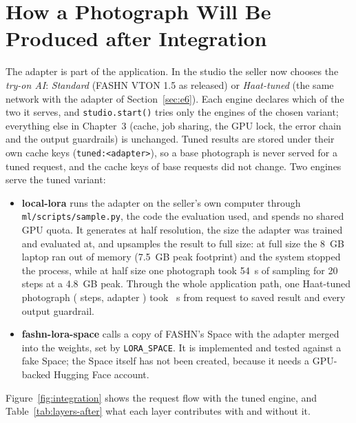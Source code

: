 \section{How a Photograph Will Be Produced after Integration}
\label{sec:integration}

The adapter is part of the application. In the studio the seller now chooses the \emph{try-on AI}: \emph{Standard} (FASHN VTON 1.5 as released) or \emph{Haat-tuned} (the same network with the adapter of Section~\ref{sec:e6}). Each engine declares which of the two it serves, and \texttt{studio.start()} tries only the engines of the chosen variant; everything else in Chapter~3 (cache, job sharing, the GPU lock, the error chain and the output guardrails) is unchanged. Tuned results are stored under their own cache keys (\texttt{tuned:<adapter>}), so a base photograph is never served for a tuned request, and the cache keys of base requests did not change. Two engines serve the tuned variant:
\begin{itemize}
\item \textbf{local-lora} runs the adapter on the seller's own computer through \texttt{ml/scripts/sample.py}, the code the evaluation used, and spends no shared GPU quota. It generates at half resolution, the size the adapter was trained and evaluated at, and upsamples the result to full size: at full size the 8~GB laptop ran out of memory (7.5~GB peak footprint) and the system stopped the process, while at half size one photograph took 54~s of sampling for 20 steps at a 4.8~GB peak.\ifTuned{} Through the whole application path, one Haat-tuned photograph (\vTunedSteps{} steps, adapter \texttt{\vTunedAdapter{}}) took \vTunedSec{}~s from request to saved result and \vTunedPass{} every output guardrail.\fi
\item \textbf{fashn-lora-space} calls a copy of FASHN's Space with the adapter merged into the weights, set by \texttt{LORA\_SPACE}. It is implemented and tested against a fake Space; the Space itself has not been created, because it needs a GPU-backed Hugging Face account.
\end{itemize}
Figure~\ref{fig:integration} shows the request flow with the tuned engine, and Table~\ref{tab:layers-after} what each layer contributes with and without it.

